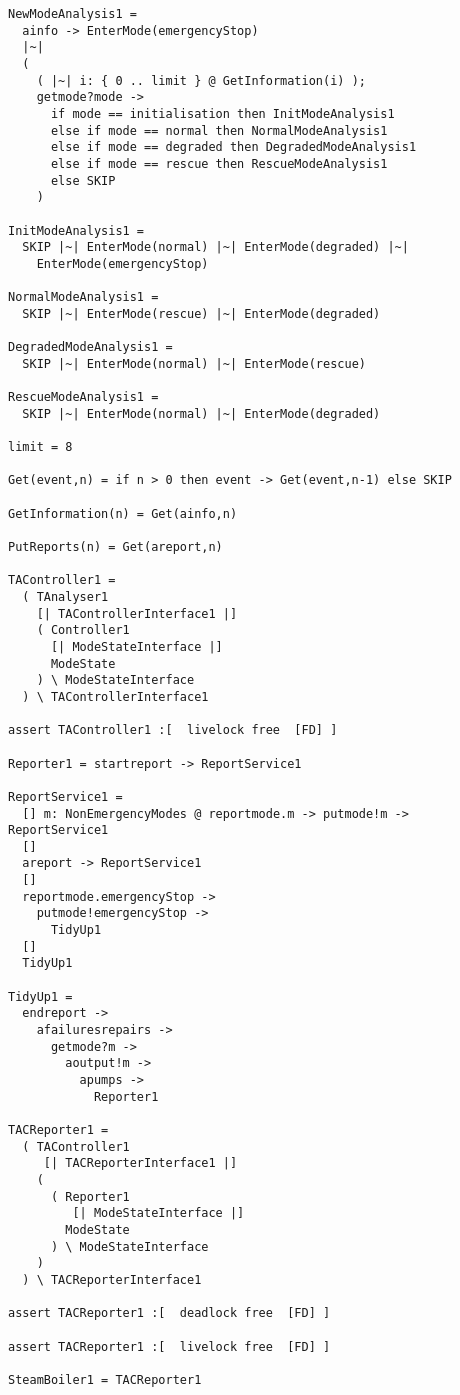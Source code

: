 \documentclass{report}
\begin{document}
\begin{verbatim}
NewModeAnalysis1 =
  ainfo -> EnterMode(emergencyStop)
  |~|
  (
    ( |~| i: { 0 .. limit } @ GetInformation(i) );
    getmode?mode ->
      if mode == initialisation then InitModeAnalysis1
      else if mode == normal then NormalModeAnalysis1
      else if mode == degraded then DegradedModeAnalysis1
      else if mode == rescue then RescueModeAnalysis1
      else SKIP
    )

InitModeAnalysis1 =
  SKIP |~| EnterMode(normal) |~| EnterMode(degraded) |~|
    EnterMode(emergencyStop)

NormalModeAnalysis1 =
  SKIP |~| EnterMode(rescue) |~| EnterMode(degraded)

DegradedModeAnalysis1 =
  SKIP |~| EnterMode(normal) |~| EnterMode(rescue)

RescueModeAnalysis1 =
  SKIP |~| EnterMode(normal) |~| EnterMode(degraded)

limit = 8

Get(event,n) = if n > 0 then event -> Get(event,n-1) else SKIP

GetInformation(n) = Get(ainfo,n)

PutReports(n) = Get(areport,n)

TAController1 =
  ( TAnalyser1
    [| TAControllerInterface1 |]
    ( Controller1
      [| ModeStateInterface |]
      ModeState
    ) \ ModeStateInterface
  ) \ TAControllerInterface1

assert TAController1 :[  livelock free  [FD] ]

Reporter1 = startreport -> ReportService1

ReportService1 =
  [] m: NonEmergencyModes @ reportmode.m -> putmode!m -> ReportService1
  []
  areport -> ReportService1
  []
  reportmode.emergencyStop ->
    putmode!emergencyStop ->
      TidyUp1
  []
  TidyUp1

TidyUp1 =
  endreport ->
    afailuresrepairs ->
      getmode?m ->
        aoutput!m ->
          apumps ->
            Reporter1

TACReporter1 =
  ( TAController1
     [| TACReporterInterface1 |]
    (
      ( Reporter1
         [| ModeStateInterface |]
        ModeState
      ) \ ModeStateInterface
    )
  ) \ TACReporterInterface1

assert TACReporter1 :[  deadlock free  [FD] ]

assert TACReporter1 :[  livelock free  [FD] ]

SteamBoiler1 = TACReporter1


























\end{verbatim}
\end{document}
